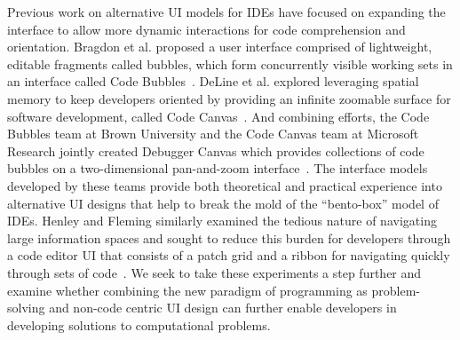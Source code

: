 \documentclass{ppig}
\begin{document}
Previous work on alternative UI models for IDEs have focused on expanding the interface to allow more dynamic interactions for code comprehension and orientation.
Bragdon et al. proposed a user interface comprised of lightweight, editable fragments called bubbles, which form concurrently visible working sets in an interface called Code Bubbles~\cite{bragdon2010bubbles}.
DeLine et al. explored leveraging spatial memory to keep developers oriented by providing an infinite zoomable surface for software development, called Code Canvas~\cite{deline2010canvas}.
And combining efforts, the Code Bubbles team at Brown University and the Code Canvas team at Microsoft Research jointly created Debugger Canvas which provides collections of code bubbles on a two-dimensional pan-and-zoom interface~\cite{deline2012debugger}.
The interface models developed by these teams provide both theoretical and practical experience into alternative UI designs that help to break the mold of the ``bento-box'' model of IDEs.
Henley and Fleming similarly examined the tedious nature of navigating large information spaces and sought to reduce this burden for developers through a code editor UI that consists of a patch grid and a ribbon for navigating quickly through sets of code~\cite{henley2014patchworks}.
We seek to take these experiments a step further and examine whether combining the new paradigm of programming as problem-solving and non-code centric UI design can further enable developers in developing solutions to computational problems.
\end{document}
